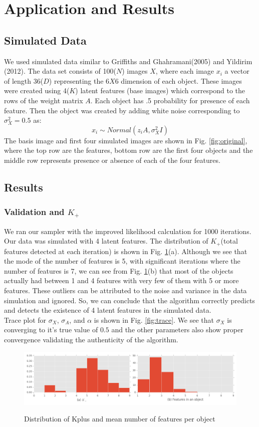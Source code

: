 \documentclass{article}
\begin{document}
\section{Application and Results}
\subsection{Simulated Data}
We used simulated data similar to Griffiths and Ghahramani(2005) and Yildirim (2012). The data set consists of 100($N$) images $X$, where each image $x_i$ a vector of length 36($D$) representing the $6X6$ dimension of each object. These images were created using 4($K$) latent features (base images) which correspond to the rows of the weight matrix $A$. Each object has .5 probability for presence of each feature. Then the object was created by adding white noise corresponding to $\sigma_X^2=0.5$ as:
\[
x_i \sim Normal(z_iA, \sigma_X^2I)
\]
The basis image and first four simulated images are shown in Fig. \ref{fig:original}, where the top row are the features, bottom row are the first four objects and the middle row represents presence or absence of each of the four features.\\

\subsection{Results}
\subsubsection{Validation and $K_+$}
We ran our sampler with the improved likelihood calculation for 1000 iterations. Our data was simulated with 4 latent features. The distribution of $K_+$(total features detected at each iteration) is shown in Fig. \ref{fig:dist}(a). Although we see that the mode of the number of features is 5, with significant iterations where the number of features is 7, we can see from Fig. \ref{fig:dist}(b) that most of the objects actually had between 1 and 4 features with very few of them with 5 or more features. These outliers can be attributed to the noise and variance in the data simulation and ignored. So, we can conclude that the algorithm correctly predicts and detects the existence of 4 latent features in the simulated data.\\
Trace plot for $\sigma_X$, $\sigma_A$, and $\alpha$ is shown in Fig. \ref{fig:trace}. We see that $\sigma_X$ is converging to it's true value of $0.5$ and the other parameters also show proper convergence validating the authenticity of the algorithm.\\ 
\begin{figure}[ht]
\caption {Distribution of Kplus and mean number of features per object}
\includegraphics[width=\linewidth]{figures/kDistribution.png}
\label{fig:dist}
\end{figure}
\end{document}
